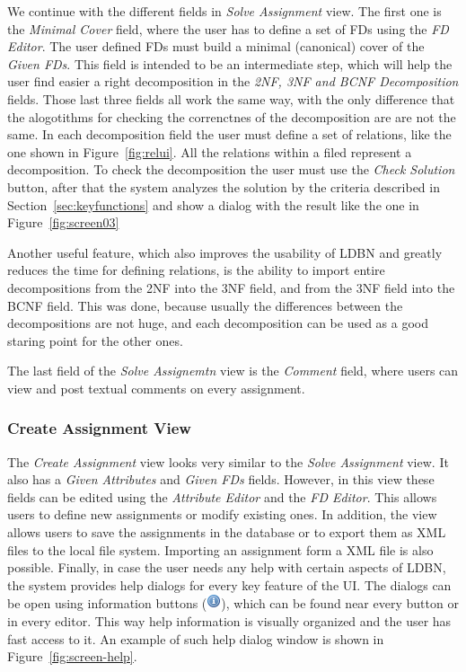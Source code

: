 We continue with the different fields in \textit{Solve Assignment} view. 
The first one is the \textit{Minimal Cover} field, where the user has to define 
a set of FDs using the \textit{FD Editor}. The user defined FDs must
build a minimal (canonical) cover of the \textit{Given FDs}.
This field is intended to be an intermediate step, which will help the user 
find easier a right decomposition
in the \textit{2NF, 3NF and BCNF Decomposition} fields. Those last three fields all
work the same way, with the only difference that the alogotithms for checking the 
correnctnes of the 
decomposition are are not the same.  
In each decomposition field the user must define a set of relations, like the one shown 
in Figure~\ref{fig:relui}. All the relations
within a filed represent a decomposition. To check the decomposition the user must
use the \textit{Check Solution} button, 
after that the system analyzes the solution by the criteria described in 
Section~\ref{sec:keyfunctions} and show a dialog with the result 
like the one in Figure~\ref{fig:screen03} 

Another useful feature, which also improves the usability of LDBN and greatly reduces
the time for defining relations, 
is the ability to 
import entire decompositions from the 2NF into the 3NF field, and from the 
3NF field into the BCNF field. This was done, because usually 
the differences between the decompositions are not huge, and each decomposition
can be used as a good staring point for the other ones.	

The last field of the \textit{Solve Assignemtn} view is the \textit{Comment} field, 
where users can view and post textual comments on every assignment.

\subsubsection{Create Assignment View}
The \textit{Create Assignment} view looks very similar to the 
\textit{Solve Assignment} view. It also has a \textit{Given Attributes} and 
\textit{Given FDs} fields. However, in this view these fields
can be edited using the \textit{Attribute Editor} and the \textit{FD Editor}. 
This allows users to define new assignments or modify existing ones. In addition, the view
allows users to save the assignments in the database or to export them as XML
files to the local file system. Importing an assignment form a XML file is also 
possible.  
\newline
Finally, in case the user needs any help with certain aspects of LDBN, the system provides 
help dialogs for every key feature of the UI. The dialogs can be open
using information buttons (\includegraphics[scale=0.5]{./img/info.png}), which can be
found near every button or in every editor. This way help information is 
visually organized and the user has fast access to it. An example of such help dialog
window is shown in Figure~\ref{fig:screen-help}.

